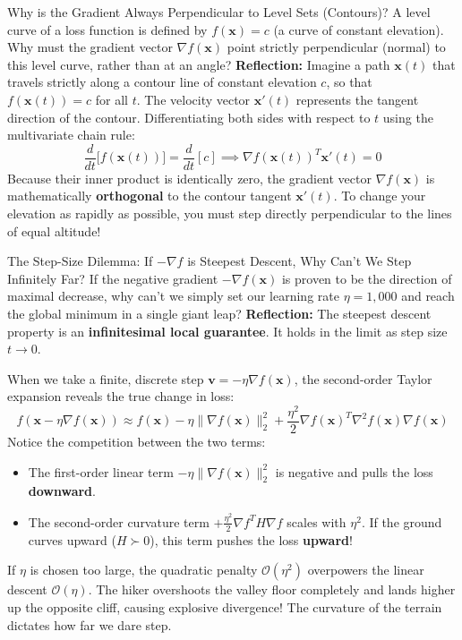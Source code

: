\begin{ponderbox}{Why is the Gradient Always Perpendicular to Level Sets (Contours)?}
A level curve of a loss function is defined by $f(\mathbf{x}) = c$ (a curve of constant elevation). Why must the gradient vector $\nabla f(\mathbf{x})$ point strictly perpendicular (normal) to this level curve, rather than at an angle?
\tcblower
\textbf{Reflection:} Imagine a path $\mathbf{x}(t)$ that travels strictly along a contour line of constant elevation $c$, so that $f(\mathbf{x}(t)) = c$ for all $t$. The velocity vector $\mathbf{x}'(t)$ represents the tangent direction of the contour.
Differentiating both sides with respect to $t$ using the multivariate chain rule:
\begin{equation*}
\frac{d}{dt} \big[ f(\mathbf{x}(t)) \big] = \frac{d}{dt}[c] \implies \nabla f(\mathbf{x}(t))^T \mathbf{x}'(t) = 0
\end{equation*}
Because their inner product is identically zero, the gradient vector $\nabla f(\mathbf{x})$ is mathematically \textbf{orthogonal} to the contour tangent $\mathbf{x}'(t)$. To change your elevation as rapidly as possible, you must step directly perpendicular to the lines of equal altitude!
\end{ponderbox}

\begin{ponderbox}{The Step-Size Dilemma: If $-\nabla f$ is Steepest Descent, Why Can't We Step Infinitely Far?}
If the negative gradient $-\nabla f(\mathbf{x})$ is proven to be the direction of maximal decrease, why can't we simply set our learning rate $\eta = 1{,}000$ and reach the global minimum in a single giant leap?
\tcblower
\textbf{Reflection:} The steepest descent property is an \textbf{infinitesimal local guarantee}. It holds in the limit as step size $t \to 0$.

When we take a finite, discrete step $\mathbf{v} = -\eta \nabla f(\mathbf{x})$, the second-order Taylor expansion reveals the true change in loss:
\begin{equation*}
f(\mathbf{x} - \eta \nabla f(\mathbf{x})) \approx f(\mathbf{x}) - \eta \|\nabla f(\mathbf{x})\|_2^2 + \frac{\eta^2}{2} \nabla f(\mathbf{x})^T \nabla^2 f(\mathbf{x}) \nabla f(\mathbf{x})
\end{equation*}
Notice the competition between the two terms:
\begin{itemize}
    \item The first-order linear term $-\eta \|\nabla f(\mathbf{x})\|_2^2$ is negative and pulls the loss \textbf{downward}.
    \item The second-order curvature term $+\frac{\eta^2}{2} \nabla f^T H \nabla f$ scales with $\eta^2$. If the ground curves upward ($H \succ 0$), this term pushes the loss \textbf{upward}!
\end{itemize}
If $\eta$ is chosen too large, the quadratic penalty $\mathcal{O}(\eta^2)$ overpowers the linear descent $\mathcal{O}(\eta)$. The hiker overshoots the valley floor completely and lands higher up the opposite cliff, causing explosive divergence! The curvature of the terrain dictates how far we dare step.
\end{ponderbox}

